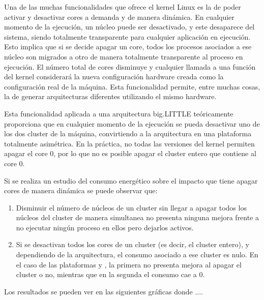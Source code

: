Una de las muchas funcionalidades que ofrece el kernel Linux es la de poder
activar y desactivar cores a demanda y de manera dinámica. En cualquier
momento de la ejecución, un núcleo puede ser desactivado, y este desaparece
del sistema, siendo totalmente transparente para cualquier aplicación en
ejecución. Esto implica que si se decide apagar un core, todos los procesos
asociados a ese núcleo son migrados a otro de manera totalmente
transparente al proceso en ejecución. El número total de cores disminuye y
cualquier llamada a una función del kernel considerará la nueva
configuración hardware creada como la configuración real de la
máquina. Esta funcionalidad permite, entre muchas cosas, la de generar
arquitecturas diferentes utilizando el mismo hardware.

Esta funcionalidad aplicada a una arquitectura big.LITTLE teóricamente
proporciona que en cualquier momento de la ejecución se pueda desactivar
uno de los dos cluster de la máquina, convirtiendo a la arquitectura en una
plataforma totalmente asimétrica. En la práctica, no todas las versiones
del kernel permiten apagar el core 0, por lo que no es posible apagar el
cluster entero que contiene al core 0.

Si se realiza un estudio del consumo energético sobre el impacto que tiene
apagar cores de manera dinámica se puede observar que: 
\begin{enumerate}
\item Disminuir el número de núcleos de un cluster sin llegar a apagar
  todos los núcleos del cluster de manera simultanea no presenta ninguna
  mejora frente a no ejecutar ningún proceso en ellos pero dejarlos
  activos.
\item Si se desactivan todos los cores de un cluster (es decir, el cluster
  entero), y dependiendo de la arquitectura, el consumo asociado a ese
  cluster es nulo. En el caso de las plataformas \juno y \odroid, la
  primera no presenta mejora al apagar el cluster o no, mientras que en la
  segunda el consumo cae a 0.
\end{enumerate}


Los resultados se pueden ver en las siguientes gráficas donde ....


